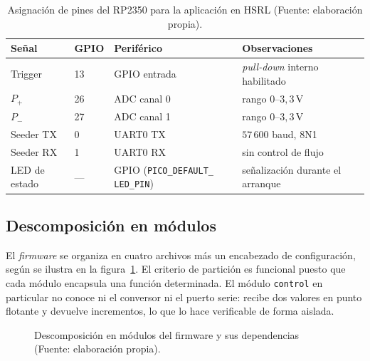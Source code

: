\begin{table}[htbp]
\centering
  \begin{tabular}{@{}llp{}p{}@{}}
  \toprule
  \textbf{Señal} & \textbf{GPIO} & \textbf{Periférico} & \textbf{Observaciones} \\
  \midrule
  Trigger       & 13 & GPIO entrada & \textit{pull-down} interno habilitado \\
  $P_+$       & 26 & ADC canal 0  & rango $0$--$3{,}3$\,V \\
  $P_-$       & 27 & ADC canal 1  & rango $0$--$3{,}3$\,V \\
  Seeder TX     & 0  & UART0 TX     & $57\,600$ baud, 8N1 \\
  Seeder RX     & 1  & UART0 RX     & sin control de flujo \\
  LED de estado & --- & GPIO (\texttt{PICO\_DEFAULT\_} \texttt{LED\_PIN}) & señalización durante el arranque \\
  \bottomrule
  \end{tabular}
  \caption{Asignación de pines del RP2350 para la aplicación en HSRL (Fuente: elaboración propia).}
 \label{tab:fw-pines}
\end{table}


\subsection{Descomposición en módulos}

El \emph{firmware} se organiza en cuatro archivos más un encabezado de configuración, según se ilustra en la figura~\ref{fig:fw-modulos}. El criterio de partición es funcional puesto que cada módulo encapsula una función determinada. El módulo \texttt{control} en particular no conoce ni el conversor ni el puerto serie: recibe dos valores en punto flotante y devuelve incrementos, lo que lo hace verificable de forma aislada.

\begin{figure}[htbp]
\centering
\resizebox{0.92\textwidth}{!}{}
\caption{Descomposición en módulos del firmware y sus dependencias (Fuente: elaboración propia).}
\label{fig:fw-modulos}
\end{figure}

